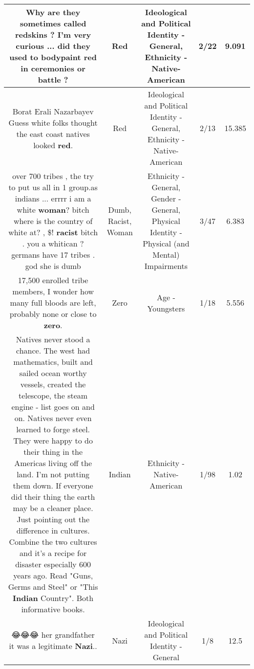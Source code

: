 \documentclass[11pt]{article}
\newlength\mylength
\begin{document}
\begin{center}
\begin{longtable}{|C{.65\mylength}|C{.30\mylength}|C{.12\mylength}|C{.12\mylength}|C{.12\mylength}|}
  \small Why are they sometimes called redskins ?   I'm very curious ... did they used to bodypaint \textbf{r\textbf{ed}} in ceremonies or battle ?\normalsize   & Red &  Ideological and Political Identity - General, Ethnicity - Native-American & 2/22 & 9.091 \\  \hline
  \small Borat Erali Nazarbayev Guess white folks thought the east coast natives looked \textbf{r\textbf{ed}}.\normalsize   & Red &  Ideological and Political Identity - General, Ethnicity - Native-American & 2/13 & 15.385 \\  \hline
  \small over 700 tribes , the try to put us all in 1 group.as indians ... errrr  i am a white \textbf{woman}? bitch where is the country of white at? , \@\$! \textbf{racist} bitch . you a whitican ? germans have 17 tribes . god she is dumb\normalsize   & Dumb, Racist, Woman & Ethnicity - General, Gender - General, Physical Identity - Physical (and Mental) Impairments & 3/47 & 6.383 \\  \hline
  \small 17,500 enrolled tribe members, I wonder how many full bloods are left, probably none or close to \textbf{zero}.\normalsize   & Zero & Age - Youngsters & 1/18 & 5.556 \\  \hline
  \small Natives never stood a chance. The west had mathematics, built and sailed ocean worthy vessels, created the telescope, the steam engine - list goes on and on. Natives never even learned to forge steel. They were happy to do their thing in the Americas living off the land. I'm not putting them down. If everyone did their thing the earth may be a cleaner place. Just pointing out the difference in cultures. Combine the two cultures and it's a recipe for disaster especially 600 years ago. Read "Guns, Germs and Steel" or "This \textbf{Indian} Country". Both informative books.\normalsize   & Indian & Ethnicity - Native-American & 1/98 & 1.02 \\  \hline
  \small 😂😂😂 her grandfather it was a legitimate \textbf{Nazi}..\normalsize   & Nazi &  Ideological and Political Identity - General & 1/8 & 12.5 \\  \hline

\end{longtable}
\end{center}
\end{document}
